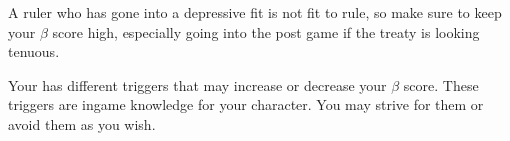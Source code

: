 \documentclass[green]{NeptuneBall}
\begin{document}
A ruler who has gone into a depressive fit is not fit to rule, so make sure to keep your $\beta$ score high, especially going into the post game if the treaty is looking tenuous. 

Your \mDepression{\MYname} has different triggers that may increase or decrease your $\beta$ score. These triggers are ingame knowledge for your character. You may strive for them or avoid them as you wish.
\end{document}
